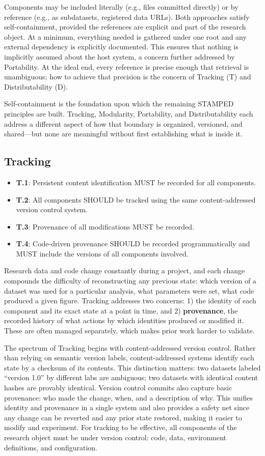 \documentclass{article}
\makeatletter
\newcommand{\hyanchor}[1]{\texorpdfstring{\Hy@raisedlink{\hypertarget{#1}{}}}{}}
\newcommand{\anchoredsubsection}[2]{\subsection[#2]{\hyanchor{#1}#2}}
\makeatother
\begin{document}
Components may be included literally (e.g., files committed directly) or by reference (e.g., as subdatasets, registered data URLs).
Both approaches satisfy self-containment, provided the references are explicit and part of the research object.
At a minimum, everything needed is gathered under one root and any external dependency is explicitly documented.
This ensures that nothing is implicitly assumed about the host system, a concern further addressed by Portability.
At the ideal end, every reference is precise enough that retrieval is unambiguous; how to achieve that precision is the concern of Tracking (T) and Distributability (D).

Self-containment is the foundation upon which the remaining STAMPED principles are built.
Tracking, Modularity, Portability, and Distributability each address a different aspect of how that boundary is organized, versioned, and shared---but none are meaningful without first establishing what is inside it.



\anchoredsubsection{tracking}{Tracking}

\begin{itemize}
    \item \textbf{T.1}: Persistent content identification MUST be recorded for all components.
    \item \textbf{T.2}: All components SHOULD be tracked using the same content-addressed version control system.
    \item \textbf{T.3}: Provenance of all modifications MUST be recorded.
    \item \textbf{T.4}: Code-driven provenance SHOULD be recorded programmatically and MUST include the versions of
    all components involved.
\end{itemize}

Research data and code change constantly during a project, and each change compounds the difficulty of reconstructing any previous state: which version of a dataset was used for a particular analysis, what parameters were set, what code produced a given figure.
Tracking addresses two concerns: 1) the identity of each component and its exact state at a point in time, and 2) \textbf{provenance}, the recorded history of what actions by which identities produced or modified it.
These are often managed separately, which makes prior work harder to validate.

The spectrum of Tracking begins with content-addressed version control.
Rather than relying on semantic version labels, content-addressed systems identify each state by a checksum of its contents.
This distinction matters: two datasets labeled ``version 1.0'' by different labs are ambiguous; two datasets with identical content hashes are provably identical.
Version control commits also capture basic provenance: who made the change, when, and a description of why.
This unifies identity and provenance in a single system and also provides a safety net since any change can be reverted and any prior state restored, making it easier to modify and experiment.
For tracking to be effective, all components of the research object must be under version control: code, data, environment definitions, and configuration.
\end{document}
